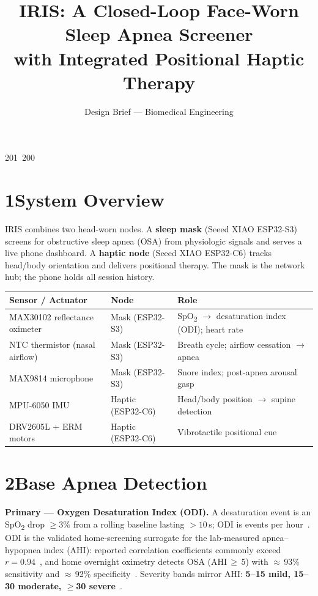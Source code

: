 201~200~\documentclass[10pt]{article}
\title{\vspace{-1.2cm}\textbf{IRIS: A Closed-Loop Face-Worn Sleep Apnea Screener\\with Integrated Positional Haptic Therapy}}
\author{\normalsize Design Brief --- Biomedical Engineering}
\date{\vspace{-0.4cm}}
\begin{document}
\maketitle
\vspace{-0.8cm}

\section*{1\quad System Overview}
IRIS combines two head-worn nodes. A \textbf{sleep mask} (Seeed XIAO ESP32-S3) screens for
obstructive sleep apnea (OSA) from physiologic signals and serves a live phone dashboard.
A \textbf{haptic node} (Seeed XIAO ESP32-C6) tracks head/body orientation and delivers
positional therapy. The mask is the network hub; the phone holds all session history.

\begin{center}
\small
\begin{tabular}{@{}>{\raggedright\arraybackslash}p{3.5cm} >{\raggedright\arraybackslash}p{4.2cm} >{\raggedright\arraybackslash}p{6.0cm}@{}}
\toprule
\textbf{Sensor / Actuator} & \textbf{Node} & \textbf{Role} \\
\midrule
MAX30102 reflectance oximeter & Mask (ESP32-S3) & SpO\textsubscript{2} $\rightarrow$ desaturation index (ODI); heart rate \\
NTC thermistor (nasal airflow) & Mask (ESP32-S3) & Breath cycle; airflow cessation $\rightarrow$ apnea \\
MAX9814 microphone & Mask (ESP32-S3) & Snore index; post-apnea arousal gasp \\
MPU-6050 IMU & Haptic (ESP32-C6) & Head/body position $\rightarrow$ supine detection \\
DRV2605L + ERM motors & Haptic (ESP32-C6) & Vibrotactile positional cue \\
\bottomrule
\end{tabular}
\end{center}

\section*{2\quad Base Apnea Detection}
\textbf{Primary --- Oxygen Desaturation Index (ODI).} A desaturation event is an SpO\textsubscript{2}
drop $\geq 3\%$ from a rolling baseline lasting $> 10$\,s; ODI is events per hour~\cite{odi-def}.
ODI is the validated home-screening surrogate for the lab-measured apnea--hypopnea index (AHI):
reported correlation coefficients commonly exceed $r = 0.94$~\cite{odi-corr}, and home overnight
oximetry detects OSA (AHI\,$\geq$\,5) with $\approx$\,93\% sensitivity and $\approx$\,92\%
specificity~\cite{oximetry-home}. Severity bands mirror AHI: \textbf{5--15 mild, 15--30 moderate,
$\geq$30 severe}~\cite{odi-def}.
\end{document}
